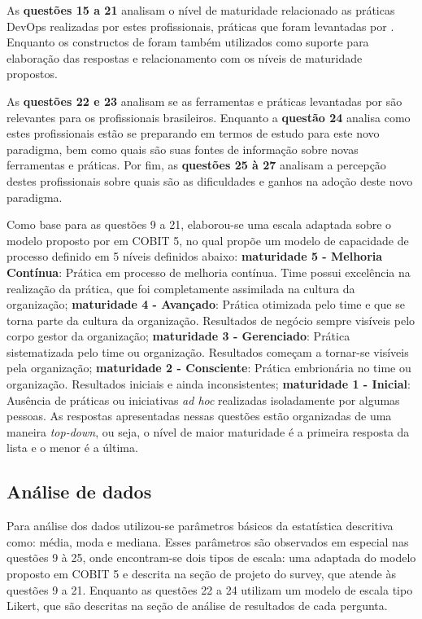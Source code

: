 \documentclass[twoside,english,brazilian]{UNISINOSartigo}
\begin{document}
As \textbf{questões 15 a 21} analisam o nível de maturidade relacionado as práticas DevOps realizadas por estes profissionais, práticas que foram levantadas por . Enquanto os constructos de  foram também utilizados como suporte para elaboração das respostas e relacionamento com os níveis de maturidade propostos.

As \textbf{questões 22 e 23} analisam se as ferramentas e práticas levantadas por  são relevantes para os profissionais brasileiros.
Enquanto a \textbf{questão 24} analisa como estes profissionais estão se preparando em termos de estudo para este novo paradigma, bem como quais são suas fontes de informação sobre novas ferramentas e práticas. Por fim, as \textbf{questões 25 à 27} analisam a percepção destes profissionais sobre quais são as dificuldades e ganhos na adoção deste novo paradigma.

 Como base para as questões 9 a 21, elaborou-se uma escala adaptada sobre o modelo proposto por  em COBIT 5, no qual propõe um modelo de capacidade de processo definido em 5 níveis definidos abaixo: \textbf{maturidade 5 - Melhoria Contínua}: Prática em processo de melhoria contínua. Time possui excelência na realização da prática, que foi completamente assimilada na cultura da organização; \textbf{maturidade 4 - Avançado}: Prática otimizada pelo time e que se torna parte da cultura da organização. Resultados de negócio sempre visíveis pelo corpo gestor da organização; \textbf{maturidade 3 - Gerenciado}: Prática sistematizada pelo time ou organização. Resultados começam a tornar-se visíveis pela organização; \textbf{maturidade 2 - Consciente}: Prática embrionária no time ou organização. Resultados iniciais e ainda inconsistentes; \textbf{maturidade 1 - Inicial}: Ausência de práticas ou iniciativas \textit{ad hoc} realizadas isoladamente por algumas pessoas. As respostas apresentadas nessas questões estão organizadas de uma maneira \textit{top-down}, ou seja, o nível de maior maturidade é a primeira resposta da lista e o menor é a última.

 \subsection{Análise de dados}
Para análise dos dados utilizou-se parâmetros básicos da estatística descritiva como: média, moda e mediana. Esses parâmetros são observados em especial nas questões 9 à 25, onde encontram-se dois tipos de escala: uma adaptada do modelo proposto em COBIT 5 e descrita na seção de projeto do survey, que atende às questões 9 a 21. Enquanto as questões 22 a 24 utilizam um modelo de escala tipo Likert, que são descritas na seção de análise de resultados de cada pergunta.
\end{document}
